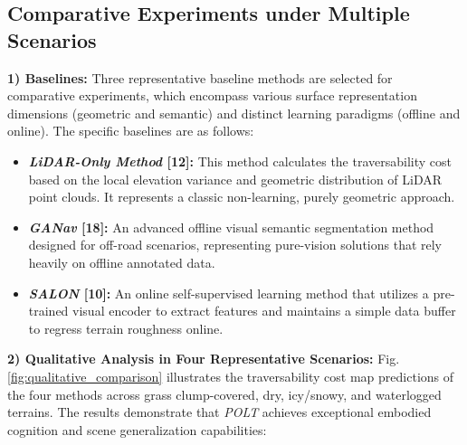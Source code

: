 \documentclass[letterpaper, 10 pt, conference]{ieeeconf}  %
\begin{document}
\subsection{Comparative Experiments under Multiple Scenarios}


\textbf{1) Baselines:} Three representative baseline methods are selected for comparative experiments, which encompass various surface representation dimensions (geometric and semantic) and distinct learning paradigms (offline and online). The specific baselines are as follows:

\begin{itemize}
\item \textbf{\textit{LiDAR-Only Method} [12]:} This method calculates the traversability cost based on the local elevation variance and geometric distribution of LiDAR point clouds. It represents a classic non-learning, purely geometric approach.
\item \textbf{\textit{GANav} [18]:} An advanced offline visual semantic segmentation method designed for off-road scenarios, representing pure-vision solutions that rely heavily on offline annotated data.
\item \textbf{\textit{SALON} [10]:} An online self-supervised learning method that utilizes a pre-trained visual encoder to extract features and maintains a simple data buffer to regress terrain roughness online.
\end{itemize}



\textbf{2) Qualitative Analysis in Four Representative Scenarios:} Fig. \ref{fig:qualitative_comparison}  illustrates the traversability cost map predictions of the four methods across grass clump-covered, dry, icy/snowy, and waterlogged terrains. The results demonstrate that \textit{POLT} achieves exceptional embodied cognition and scene generalization capabilities:
\end{document}
